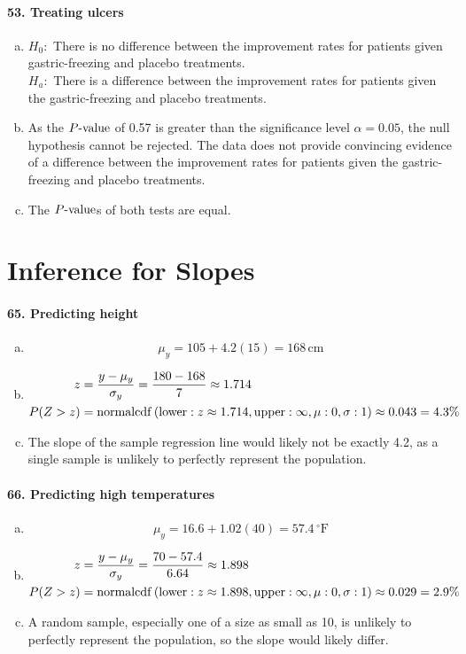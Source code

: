 \documentclass[../Homework]{subfiles}
\begin{document}
		\paragraph{53. Treating ulcers}
			\begin{enumerate}[a.]
				\item
					$H_0:$ There is no difference between the improvement rates for patients given gastric-freezing and placebo treatments. \\
					$H_a:$ There is a difference between the improvement rates for patients given the gastric-freezing and placebo treatments.
				\item
					As the $P\text{-value}$ of 0.57 is greater than the significance level $\alpha = 0.05$, the null hypothesis cannot be rejected. The data does not provide convincing evidence of a difference between the improvement rates for patients given the gastric-freezing and placebo treatments.
				\item
					The $P\text{-value}$s of both tests are equal.
			\end{enumerate}
	\section{Inference for Slopes}
		\paragraph{65. Predicting height}
			\begin{enumerate}[a.]
				\item
					\[\mu_y = 105 + 4.2(15) = 168\,\text{cm}\]
				\item
					\begin{align*}
						z &= \frac{y - \mu_y}{\sigma_y} = \frac{180 - 168}{7} \approx  1.714 \\
						P(Z > z) &= \operatorname{normalcdf}\left(\operatorname{lower}: z \approx 1.714, \operatorname{upper}: \infty, \mu: 0, \sigma: 1\right) \approx 0.043 = 4.3\%
					\end{align*}
				\item
					The slope of the sample regression line would likely not be exactly 4.2, as a single sample is unlikely to perfectly represent the population.
			\end{enumerate}
		\paragraph{66. Predicting high temperatures}
			\begin{enumerate}[a.]
				\item
					\[\mu_y = 16.6 + 1.02(40) = 57.4\,^\circ\mathrm{F}\]
				\item
					\begin{align*}
						z &= \frac{y - \mu_y}{\sigma_y} = \frac{70 - 57.4}{6.64} \approx 1.898 \\
						P(Z > z) &= \operatorname{normalcdf}\left(\operatorname{lower}: z \approx 1.898, \operatorname{upper}: \infty, \mu: 0, \sigma: 1\right) \approx 0.029 = 2.9\%
					\end{align*}
				\item
					A random sample, especially one of a size as small as 10, is unlikely to perfectly represent the population, so the slope would likely differ.
			\end{enumerate}
\end{document}
